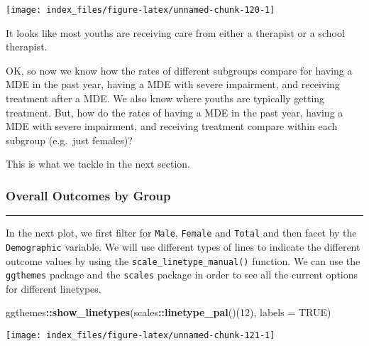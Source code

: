 \documentclass[
]{article}
\newenvironment{Shaded}{\begin{snugshade}}{\end{snugshade}}
\newcommand{\DataTypeTok}[1]{\textcolor[rgb]{0.13,0.29,0.53}{#1}}
\newcommand{\DecValTok}[1]{\textcolor[rgb]{0.00,0.00,0.81}{#1}}
\newcommand{\KeywordTok}[1]{\textcolor[rgb]{0.13,0.29,0.53}{\textbf{#1}}}
\newcommand{\NormalTok}[1]{#1}
\newcommand{\OperatorTok}[1]{\textcolor[rgb]{0.81,0.36,0.00}{\textbf{#1}}}
\newcommand{\OtherTok}[1]{\textcolor[rgb]{0.56,0.35,0.01}{#1}}
\begin{document}
\begin{center}\texttt{[image: index\_files/figure-latex/unnamed-chunk-120-1]} \end{center}

It looks like most youths are receiving care from either a therapist or
a school therapist.

OK, so now we know how the rates of different subgroups compare for
having a MDE in the past year, having a MDE with severe impairment, and
receiving treatment after a MDE. We also know where youths are typically
getting treatment. But, how do the rates of having a MDE in the past
year, having a MDE with severe impairment, and receiving treatment
compare within each subgroup (e.g.~just females)?

This is what we tackle in the next section.

\hypertarget{overall-outcomes-by-group}{%
\subsubsection{\texorpdfstring{\textbf{Overall Outcomes by
Group}}{Overall Outcomes by Group}}\label{overall-outcomes-by-group}}

\begin{center}\rule{0.5\linewidth}{0.5pt}\end{center}

In the next plot, we first filter for \texttt{Male}, \texttt{Female} and
\texttt{Total} and then facet by the \texttt{Demographic} variable. We
will use different types of lines to indicate the different outcome
values by using the \texttt{scale\_linetype\_manual()} function. We can
use the \texttt{ggthemes} package and the \texttt{scales} package in
order to see all the current options for different linetypes.

\begin{Shaded}
\begin{Highlighting}[]
\NormalTok{ggthemes}\OperatorTok{::}\KeywordTok{show_linetypes}\NormalTok{(scales}\OperatorTok{::}\KeywordTok{linetype_pal}\NormalTok{()(}\DecValTok{12}\NormalTok{), }\DataTypeTok{labels =} \OtherTok{TRUE}\NormalTok{)}
\end{Highlighting}
\end{Shaded}

\begin{center}\texttt{[image: index\_files/figure-latex/unnamed-chunk-121-1]} \end{center}
\end{document}
